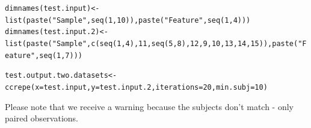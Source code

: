 \documentclass{article}\usepackage[]{graphicx}\usepackage[usenames,dvipsnames]{color}
\newcommand{\hlnum}[1]{\textcolor[rgb]{0.816,0.125,0.439}{#1}}%
\newcommand{\hlstr}[1]{\textcolor[rgb]{0.251,0.627,0.251}{#1}}%
\newcommand{\hlstd}[1]{\textcolor[rgb]{0.251,0.251,0.251}{#1}}%
\newcommand{\hlkwb}[1]{\textcolor[rgb]{0,0,0}{#1}}%
\newcommand{\hlkwc}[1]{\textcolor[rgb]{0.251,0.251,0.251}{#1}}%
\newcommand{\hlkwd}[1]{\textcolor[rgb]{0.878,0.439,0.125}{#1}}%
\newenvironment{knitrout}{}{} %
\begin{document}
\begin{knitrout}
\begin{kframe}
\begin{alltt}
\hlkwd{dimnames}\hlstd{(test.input)} \hlkwb{<-} \hlkwd{list}\hlstd{(}\hlkwd{paste}\hlstd{(}\hlstr{"Sample"}\hlstd{,}\hlkwd{seq}\hlstd{(}\hlnum{1}\hlstd{,}\hlnum{10}\hlstd{)),}\hlkwd{paste}\hlstd{(}\hlstr{"Feature"}\hlstd{,}\hlkwd{seq}\hlstd{(}\hlnum{1}\hlstd{,}\hlnum{4}\hlstd{)))}
\hlkwd{dimnames}\hlstd{(test.input.2)} \hlkwb{<-} \hlkwd{list}\hlstd{(}\hlkwd{paste}\hlstd{(}\hlstr{"Sample"}\hlstd{,}\hlkwd{c}\hlstd{(}\hlkwd{seq}\hlstd{(}\hlnum{1}\hlstd{,}\hlnum{4}\hlstd{),}\hlnum{11}\hlstd{,}\hlkwd{seq}\hlstd{(}\hlnum{5}\hlstd{,}\hlnum{8}\hlstd{),}\hlnum{12}\hlstd{,}\hlnum{9}\hlstd{,}\hlnum{10}\hlstd{,}\hlnum{13}\hlstd{,}\hlnum{14}\hlstd{,}\hlnum{15}\hlstd{)),}\hlkwd{paste}\hlstd{(}\hlstr{"Feature"}\hlstd{,}\hlkwd{seq}\hlstd{(}\hlnum{1}\hlstd{,}\hlnum{7}\hlstd{)))}

\hlstd{test.output.two.datasets} \hlkwb{<-} \hlkwd{ccrepe}\hlstd{(}\hlkwc{x}\hlstd{=test.input,} \hlkwc{y}\hlstd{=test.input.2,} \hlkwc{iterations}\hlstd{=}\hlnum{20}\hlstd{,} \hlkwc{min.subj}\hlstd{=}\hlnum{10}\hlstd{)}
\end{alltt}


{\ttfamily\noindent\color{warningcolor}{\#\# Warning in preprocess\_data(CA): Removing subjects Sample 11, Sample 12, Sample 13, Sample 14, Sample 15 from dataset y because they are not in dataset x.}}\end{kframe}
\end{knitrout}
Please note that we receive a warning because the subjects don't match - only paired observations.
 
\end{document}
